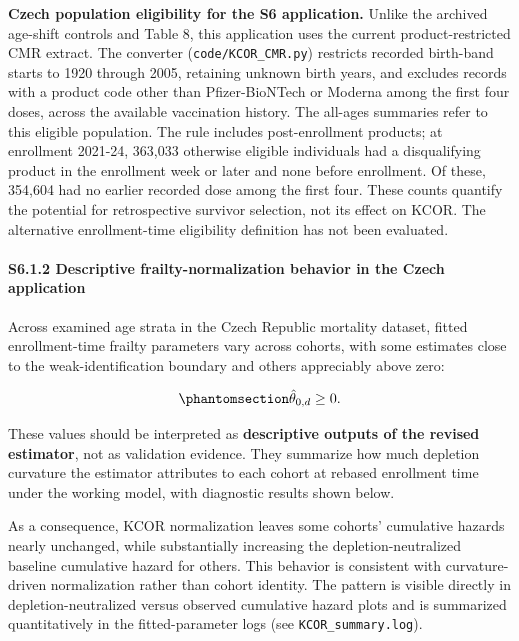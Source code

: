 \documentclass[
]{article}
\newcounter{none} %
\begin{document}
\textbf{Czech population eligibility for the S6 application.} Unlike the archived age-shift controls and Table 8, this application uses the current product-restricted CMR extract. The converter (\texttt{code/KCOR\_CMR.py}) restricts recorded birth-band starts to 1920 through 2005, retaining unknown birth years, and excludes records with a product code other than Pfizer-BioNTech or Moderna among the first four doses, across the available vaccination history. The all-ages summaries refer to this eligible population. The rule includes post-enrollment products; at enrollment 2021-24, 363,033 otherwise eligible individuals had a disqualifying product in the enrollment week or later and none before enrollment. Of these, 354,604 had no earlier recorded dose among the first four. These counts quantify the potential for retrospective survivor selection, not its effect on KCOR. The alternative enrollment-time eligibility definition has not been evaluated.

\paragraph{S6.1.2 Descriptive frailty-normalization behavior in the Czech application}\label{s6.1.2-descriptive-frailty-normalization-behavior-in-the-czech-application}

Across examined age strata in the Czech Republic mortality dataset, fitted enrollment-time frailty parameters vary across cohorts, with some estimates close to the weak-identification boundary and others appreciably above zero:

\begin{equation}\protect\phantomsection\label{eq:si_theta_near_zero}{\hat{\theta}_{0,d} \ge 0.}\end{equation}

These values should be interpreted as \textbf{descriptive outputs of the revised estimator}, not as validation evidence. They summarize how much depletion curvature the estimator attributes to each cohort at rebased enrollment time under the working model, with diagnostic results shown below.

As a consequence, KCOR normalization leaves some cohorts' cumulative hazards nearly unchanged, while substantially increasing the depletion-neutralized baseline cumulative hazard for others. This behavior is consistent with curvature-driven normalization rather than cohort identity. The pattern is visible directly in depletion-neutralized versus observed cumulative hazard plots and is summarized quantitatively in the fitted-parameter logs (see \texttt{KCOR\_summary.log}).
\end{document}
